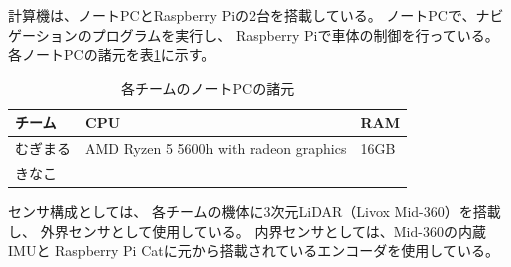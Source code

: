 \documentclass[twocolumn,9pt]{jsproceedings}
\begin{document}
計算機は、ノートPCとRaspberry Piの2台を搭載している。
ノートPCで、ナビゲーションのプログラムを実行し、
Raspberry Piで車体の制御を行っている。
各ノートPCの諸元を表\ref{table:laptop}に示す。

\begin{table}[H]
  \centering
  \caption{各チームのノートPCの諸元}
  \label{table:laptop}
	  \begin{tabular}{|l|p{5.0cm}|l|}
    \hline
    チーム   & CPU & RAM\\ 
    \hline
    むぎまる & AMD Ryzen 5 5600h with radeon graphics & 16GB \\
    \hline
    きなこ  & & \\
    \hline
  \end{tabular}
\end{table}

センサ構成としては、
各チームの機体に3次元LiDAR（Livox Mid-360）を搭載し、
外界センサとして使用している。
内界センサとしては、Mid-360の内蔵IMUと
Raspberry Pi Catに元から搭載されているエンコーダを使用している。

\end{document}
